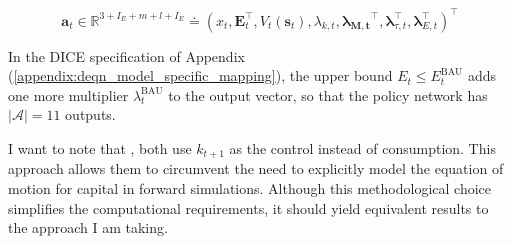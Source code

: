 \begin{equation}
    \bm{a}_t \in \mathbb{R}^{3+I_E+m+l+I_E} \doteq 
    \left ( 
        x_{t}, \bm{E}_t^\top, V_t(\bm{s}_t), \lambda_{k,t}, \bm{\lambda_{M,t}}^\top, \bm{\lambda}_{\tau, t}^\top, \bm{\lambda}_{E, t}^\top 
    \right)^\top 
\end{equation} 

In the DICE specification of Appendix (\ref{appendix:deqn_model_specific_mapping}), the upper bound \(E_t \leq E_t^{\text{BAU}}\) adds one more multiplier \(\lambda_t^{\text{BAU}}\) to the output vector, so that the policy network has \(|\mathcal{A}| = 11\) outputs.

I want to note that \textcite{Folini2024ClimateInCE, friedl2023_deepUQ}, both use \(k_{t+1}\) as the control instead of consumption. This approach allows them to circumvent the need to explicitly model the equation of motion for capital in forward simulations. Although this methodological choice simplifies the computational requirements, it should yield equivalent results to the approach I am taking.